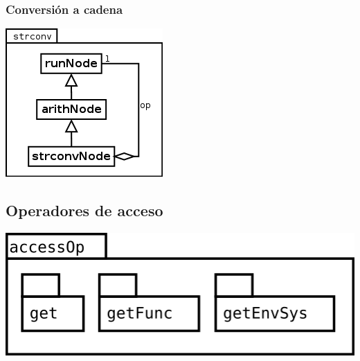 \subsubsection {Conversión a cadena}
\begin{center}
\includegraphics[scale=0.4]{strconv.png} \\
\end{center}

\pagebreak
\subsection {Operadores de acceso}
\begin{center}
\includegraphics[scale=0.4]{accessOp-package.png} \\
\end{center}

